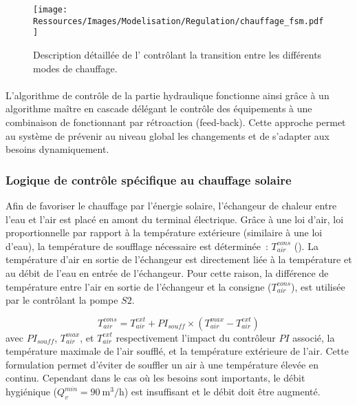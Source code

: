 \begin{figure}
    \centering
    \texttt{[image: Ressources/Images/Modelisation/Regulation/chauffage\_fsm.pdf]}
    \caption[ contrôlant la transition entre les différents modes de chauffage]
            {Description détaillée de l’ contrôlant la transition entre
             les différents modes de chauffage.}
    \label{fig:automate_chauffage}
\end{figure}


\paragraph{} %
\label{par:conclusion_algo}
L’algorithme de contrôle de la partie hydraulique fonctionne ainsi grâce à un algorithme
maître en cascade délégant le contrôle des équipements à une combinaison de
 fonctionnant par rétroaction (feed-back). Cette approche permet au système de
prévenir au niveau global les changements et de s’adapter aux besoins dynamiquement.


\subsubsection{Logique de contrôle spécifique au chauffage solaire} %
\label{ssub:logique_de_controle_specifique_au_chauffage_solaire}
Afin de favoriser le chauffage par l’énergie solaire, l’échangeur de chaleur entre l’eau
et l’air est placé en amont du terminal électrique. Grâce à une loi d’air, loi
proportionnelle par rapport à la température extérieure (similaire à une loi d’eau), la
température de soufflage nécessaire est déterminée~: $T_{air}^{cons}$ ().
La température d’air en sortie de l’échangeur est directement liée à la température et au
débit de l’eau en entrée de l’échangeur. Pour cette raison, la différence de température
entre l’air en sortie de l’échangeur et la consigne ($T_{air}^{cons}$), est utilisée
par le  contrôlant la pompe $S2$.

\begin{equation}\label{eq:temp_soufflage}
    T_{air}^{cons} = T_{air}^{ext} + PI_{souff} \times (T_{air}^{max} - T_{air}^{ext})
\end{equation}
avec $PI_{souff}$, $T_{air}^{max}$, et $T_{air}^{ext}$ respectivement l’impact du
contrôleur $PI$ associé, la température maximale de l’air soufflé, et la température
extérieure de l’air. Cette formulation permet d’éviter de souffler un air à une
température élevée en continu. Cependant dans le cas où les besoins sont importants, le
débit hygiénique ($Q_{v}^{min} = \SI[per-mode=symbol]{90}{\meter\cubed\per\hour}$) est insuffisant
et le débit doit être augmenté.

